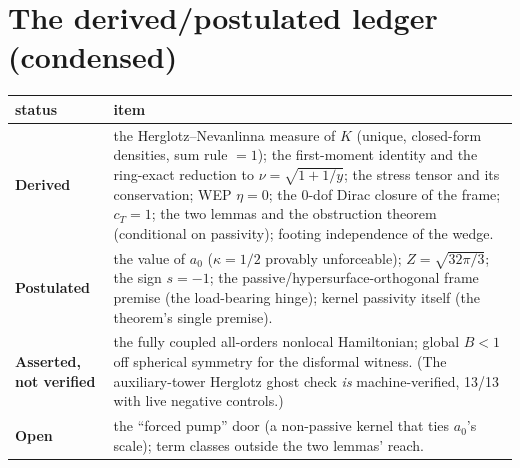 \documentclass[11pt]{article}
\begin{document}
\section{The derived/postulated ledger (condensed)}\label{app:ledger}

\begin{center}
\small
\begin{tabular}{lp{10.5cm}}
\toprule
status & item\\
\midrule
\textbf{Derived} & the Herglotz--Nevanlinna measure of $K$ (unique, closed-form densities, sum rule $=1$); the first-moment identity and the ring-exact reduction to $\nu=\sqrt{1+1/y}$; the stress tensor and its conservation; WEP $\eta=0$; the 0-dof Dirac closure of the frame; $c_T=1$; the two lemmas and the obstruction theorem (conditional on passivity); footing independence of the wedge.\\
\midrule
\textbf{Postulated} & the value of $a_0$ ($\kappa=1/2$ provably unforceable); $Z=\sqrt{32\pi/3}$; the sign $s=-1$; the passive/hypersurface-orthogonal frame premise (the load-bearing hinge); kernel passivity itself (the theorem's single premise).\\
\midrule
\textbf{Asserted, not verified} & the fully coupled all-orders nonlocal Hamiltonian; global $B<1$ off spherical symmetry for the disformal witness. (The auxiliary-tower Herglotz ghost check \emph{is} machine-verified, 13/13 with live negative controls.)\\
\midrule
\textbf{Open} & the ``forced pump'' door (a non-passive kernel that ties $a_0$'s scale); term classes outside the two lemmas' reach.\\
\bottomrule
\end{tabular}
\end{center}
\end{document}
